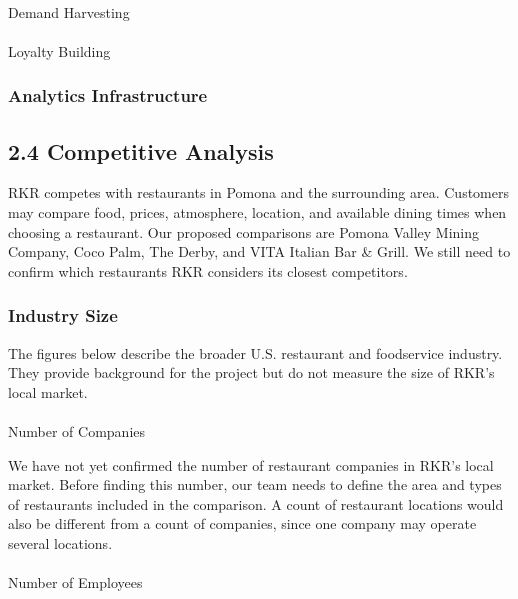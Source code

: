 \documentclass[
  12pt,
  letterpaper,
  DIV=11,
  numbers=noendperiod]{scrartcl}
\makeatletter
\let\oldparagraph\paragraph
\renewcommand{\paragraph}{
    \@ifstar
      \xxxParagraphStar
      \xxxParagraphNoStar
  }
\newcommand{\xxxParagraphStar}[1]{\oldparagraph*{#1}\mbox{}}
\newcommand{\xxxParagraphNoStar}[1]{\oldparagraph{#1}\mbox{}}
\makeatother
\begin{document}
\paragraph{Demand Harvesting}\label{demand-harvesting}

\paragraph{Loyalty Building}\label{loyalty-building}

\subsubsection{Analytics Infrastructure}\label{analytics-infrastructure}

\subsection{2.4 Competitive Analysis}\label{competitive-analysis}

RKR competes with restaurants in Pomona and the surrounding area.
Customers may compare food, prices, atmosphere, location, and available
dining times when choosing a restaurant. Our proposed comparisons are
Pomona Valley Mining Company, Coco Palm, The Derby, and VITA Italian Bar
\& Grill. We still need to confirm which restaurants RKR considers its
closest competitors.

\subsubsection{Industry Size}\label{industry-size}

The figures below describe the broader U.S. restaurant and foodservice
industry. They provide background for the project but do not measure the
size of RKR's local market.

\paragraph{Number of Companies}\label{number-of-companies}

We have not yet confirmed the number of restaurant companies in RKR's
local market. Before finding this number, our team needs to define the
area and types of restaurants included in the comparison. A count of
restaurant locations would also be different from a count of companies,
since one company may operate several locations.

\paragraph{Number of Employees}\label{number-of-employees}
\end{document}
